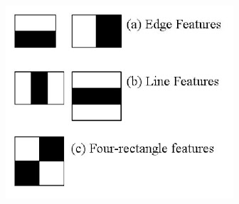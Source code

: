 \documentclass[11pt]{article}
\begin{document}
\begin{minipage}[t]{0.35\textwidth}
    \begin{center}
        \includegraphics[width=\textwidth]{images/haar_features.jpg}
        \label{fig:haar_features_1}
    \end{center}
\end{minipage}\hspace{1.5cm}
\end{document}
